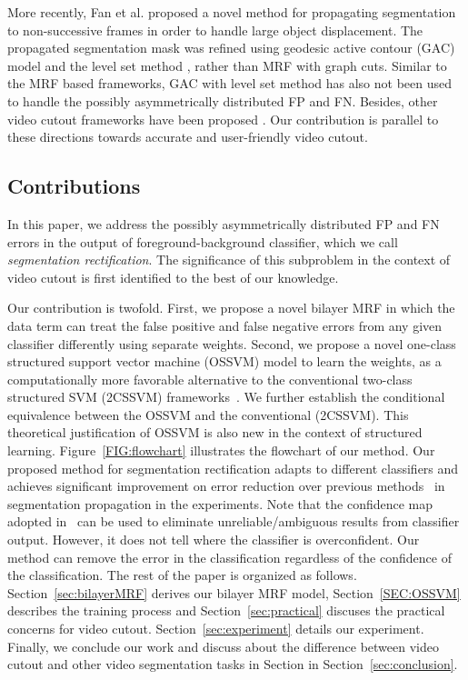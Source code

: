 \documentclass[10pt,journal,compsoc]{newIEEEtran}
\begin{document}
More recently, Fan et al.\cite{Fan2015JumpCut} proposed a novel method for propagating segmentation to non-successive frames in order to handle large object displacement. The propagated segmentation mask was refined using geodesic active contour (GAC) model \cite{Caselles97GAC} and the level set method \cite{OsherSethian88Fronts}, rather than MRF with graph cuts. Similar to the MRF based frameworks, GAC with level set method has also not been used to handle the possibly asymmetrically distributed FP and FN. Besides, other video cutout frameworks have been proposed \cite{Tong2011video,FuHongbo2012EXCOL,zhang2015efficient}. Our contribution is parallel to these directions towards accurate and user-friendly video cutout.

\subsection{Contributions}
In this paper, we address the possibly asymmetrically distributed FP and FN errors in the output of foreground-background classifier, which we call {\em segmentation rectification}. The significance of this subproblem in the context of video cutout is first identified to the best of our knowledge.

Our contribution is twofold. First, we propose a novel bilayer MRF in which the data term can treat the false positive and false negative errors from any given classifier differently using separate weights. Second, we propose a novel one-class structured support vector machine (OSSVM) model to learn the weights, as a computationally more favorable alternative to the conventional two-class structured SVM (2CSSVM) frameworks~\cite{Taskar05LargeMargin,Tsochantaridis05LargeMarginSSVM}. We further establish the conditional equivalence between the OSSVM and the conventional (2CSSVM). This theoretical justification of OSSVM is also new in the context of structured learning. Figure~\ref{FIG:flowchart} illustrates the flowchart of our method.
Our proposed method for segmentation rectification adapts to different classifiers and achieves significant improvement on error reduction over previous methods~\cite{Zhong2012UDC_SIGGRAPHAsia,Bai09VideoSnapCut_SIGGRAPH} in segmentation propagation in the experiments. Note that the {confidence map} adopted in~\cite{Zhong2012UDC_SIGGRAPHAsia} can be used to eliminate unreliable/ambiguous results from classifier output. However, it does not tell where the classifier is overconfident. Our method can remove the error in the classification regardless of the confidence of the classification.
The rest of the paper is organized as follows. Section~\ref{sec:bilayerMRF} derives our bilayer MRF model, Section~\ref{SEC:OSSVM} describes the training process and Section~\ref{sec:practical} discuses the practical concerns for video cutout. Section~\ref{sec:experiment} details our experiment. Finally, we conclude our work and discuss about the difference between video cutout and other video segmentation tasks in Section in Section~\ref{sec:conclusion}.
\end{document}
